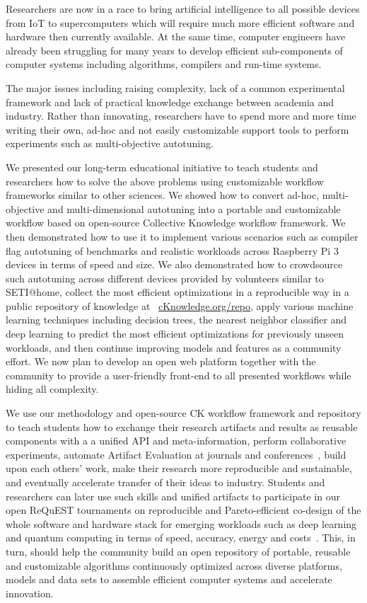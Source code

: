 Researchers are now in a race to bring artificial intelligence to all possible
devices from IoT to supercomputers which will require 
much more efficient software and hardware then currently available.
%
At the same time, computer engineers have already been struggling for many years 
to develop efficient sub-components of computer systems including
algorithms, compilers and run-time systems.

The major issues including raising complexity, lack of a common experimental framework 
and lack of practical knowledge exchange between academia and industry.
%
Rather than innovating, researchers have to spend more and more time 
writing their own, ad-hoc and not easily customizable support tools 
to perform experiments such as multi-objective autotuning.


We presented our long-term educational initiative to teach
students and researchers how to solve the above problems 
using customizable workflow frameworks similar to other sciences.
%
We showed how to convert ad-hoc, multi-objective
and multi-dimensional autotuning into a portable and customizable workflow 
based on open-source Collective Knowledge workflow framework.
%
We then demonstrated how to use it to implement various scenarios
such as compiler flag autotuning of benchmarks and realistic workloads
across Raspberry Pi 3 devices in terms of speed and size.
%
We also demonstrated how to crowdsource such autotuning across different
devices provided by volunteers similar to SETI@home, collect the most efficient optimizations
in a reproducible way in a public repository of knowledge at ~\href{http://cknowledge.org/repo}{cKnowledge.org/repo}, 
apply various machine learning techniques including decision trees, the nearest neighbor classifier
and deep learning to predict the most efficient optimizations for previously
unseen workloads, and then continue improving models and features
as a community effort.
%
We now plan to develop an open web platform together with the community
to provide a user-friendly front-end to all presented workflows 
while hiding all complexity.

We use our methodology and open-source CK workflow framework and repository
to teach students how to exchange their research artifacts and results 
as reusable components with a a unified API and meta-information,
perform collaborative experiments, automate Artifact Evaluation
at journals and conferences~\cite{ctuning-ae1}, build upon each others' work,
make their research more reproducible and sustainable, 
and eventually accelerate transfer of their ideas to industry.
%
Students and researchers can later use such skills and unified artifacts
to participate in our open ReQuEST tournaments on reproducible and Pareto-efficient
co-design of the whole software and hardware stack for emerging workloads
such as deep learning and quantum computing in terms of
speed, accuracy, energy and costs~\cite{request}.
%
This, in turn, should help the community build an open repository of 
portable, reusable and customizable algorithms continuously optimized
across diverse platforms, models and data sets
to assemble efficient computer systems
and accelerate innovation.
